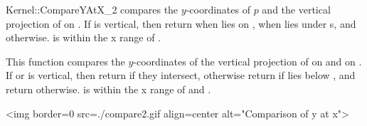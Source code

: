 \begin{ccRefFunctionObjectConcept}{Kernel::CompareYAtX_2}
{compares the $y$-coordinates of $p$ and the vertical projection
 of  on .  If  is vertical, then return
  when  lies on ,  when  lies
 under {s}, and  otherwise.
 \ccPrecond {} is within the x range of .}

{This function compares the $y$-coordinates of the vertical projection 
 of  on  and on .  If  or 
 is vertical, then return  if they intersect, otherwise return
  if  lies below , and return 
 otherwise.
 \ccPrecond {} is within the x range of  and .}

\begin{ccHtmlOnly}
<img border=0 src=./compare2.gif align=center alt="Comparison of y at x">
\end{ccHtmlOnly} 

\ccSeeAlso
{}\\

\end{ccRefFunctionObjectConcept}
